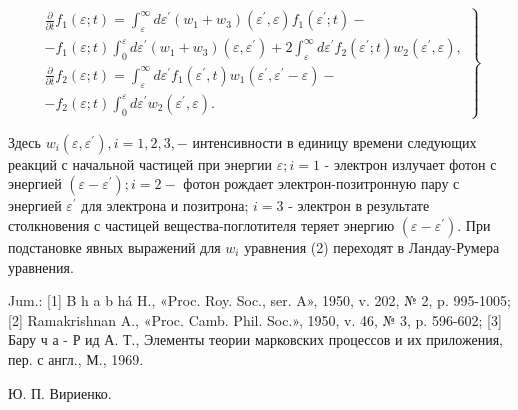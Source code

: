 \documentclass[10pt]{article}
\begin{document}
\[

\left.\begin{array}{l}

\frac{\partial}{\partial t} f_{1}(\varepsilon ; t)=\int_{\varepsilon}^{\infty} d \varepsilon^{\prime}\left(w_{1}+w_{3}\right)\left(\varepsilon^{\prime}, \varepsilon\right) f_{1}\left(\varepsilon^{\prime} ; t\right)- \\

-f_{1}(\varepsilon ; t) \int_{0}^{\varepsilon} d \varepsilon^{\prime}\left(w_{1}+w_{3}\right)\left(\varepsilon, \varepsilon^{\prime}\right)+2 \int_{\varepsilon}^{\infty} d \varepsilon^{\prime} f_{2}\left(\varepsilon^{\prime} ; t\right) w_{2}\left(\varepsilon^{\prime}, \varepsilon\right), \\

\frac{\partial}{\partial t} f_{2}(\varepsilon ; t)=\int_{\varepsilon}^{\infty} d \varepsilon^{\prime} f_{1}\left(\varepsilon^{\prime}, t\right) w_{1}\left(\varepsilon^{\prime}, \varepsilon^{\prime}-\varepsilon\right)- \\

-f_{2}(\varepsilon ; t) \int_{0}^{\varepsilon} d \varepsilon^{\prime} w_{2}\left(\varepsilon^{\prime}, \varepsilon\right) .

\end{array}\right\}

\]



Здесь $w_{i}\left(\varepsilon, \varepsilon^{\prime}\right), i=1,2,3,-$ интенсивности в единицу времени следующих реакций с начальной частицей при энергии $\varepsilon ; i=1$ - электрон излучает фотон с энергией $\left(\varepsilon-\varepsilon^{\prime}\right) ; i=2-$ фотон рождает электрон-позитронную пару с энергией $\varepsilon^{\prime}$ для электрона и позитрона; $i=3$ - электрон в результате столкновения с частицей вещества-поглотителя теряет энергию $\left(\varepsilon-\varepsilon^{\prime}\right)$. При подстановке явных выражений для $w_{i}$ уравнения (2) переходят в Ландау-Румера уравнения.



Jum.: [1] B h a b há H., «Proc. Roy. Soc., ser. A», 1950, v. 202, № 2, p. 995-1005; [2] Ramakrishnan A., «Proc. Camb. Phil. Soc.», 1950, v. 46, № 3, p. 596-602; [3] Бару ч а - Р ид А. Т., Элементы теории марковских процессов и их приложения, пер. с англ., М., 1969.



Ю. П. Вириенко.
\end{document}
